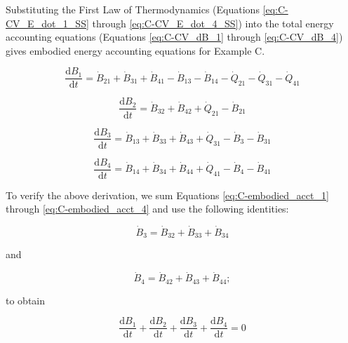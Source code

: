 \documentclass[authoryear,preprint,review,12pt]{elsarticle}
\begin{document}
Substituting the First Law of Thermodynamics (Equations \ref{eq:C-CV_E_dot_1_SS} through \ref{eq:C-CV_E_dot_4_SS}) into the total energy accounting equations (Equations \ref{eq:C-CV_dB_1} through \ref{eq:C-CV_dB_4}) gives embodied energy accounting equations for Example C.

\begin{equation} \label{eq:C-embodied_acct_1}
	\frac{\mathrm{d}B_{1}}{\mathrm{d}t} 	 = \dot{B}_{21} + \dot{B}_{31} + \dot{B}_{41} - \dot{B}_{13} - \dot{B}_{14} - \dot{Q}_{21} - \dot{Q}_{31} - \dot{Q}_{41}
\end{equation}

\begin{equation} \label{eq:C-embodied_acct_2}
	\frac{\mathrm{d}B_{2}}{\mathrm{d}t} 	 = \dot{B}_{32} + \dot{B}_{42} + \dot{Q}_{21} - \dot{B}_{21}
\end{equation}

\begin{equation} \label{eq:C-embodied_acct_3}
	\frac{\mathrm{d}B_{3}}{\mathrm{d}t} 	 = \dot{B}_{13} + \dot{B}_{33} + \dot{B}_{43} + \dot{Q}_{31} - \dot{B}_{3} - \dot{B}_{31}
\end{equation}

\begin{equation} \label{eq:C-embodied_acct_4}
	\frac{\mathrm{d}B_{4}}{\mathrm{d}t}	 = \dot{B}_{14} + \dot{B}_{34} + \dot{B}_{44} + \dot{Q}_{41} - \dot{B}_{4} - \dot{B}_{41}
\end{equation}

To verify the above derivation, we sum Equations \ref{eq:C-embodied_acct_1} through \ref{eq:C-embodied_acct_4} and use the following identities:

\begin{equation} \label{eq:C-B_sum_3_output}
	\dot{B}_3 = \dot{B}_{32} + \dot{B}_{33} + \dot{B}_{34}
\end{equation}

\noindent and

\begin{equation} \label{eq:C-B_sum_4_output}
	\dot{B}_4 = \dot{B}_{42} + \dot{B}_{43} + \dot{B}_{44};
\end{equation}

\noindent to obtain

\begin{equation} \label{eq:C-B_sums_to_zero}
	\frac{\mathrm{d}B_{1}}{\mathrm{d}t} + \frac{\mathrm{d}B_{2}}{\mathrm{d}t} + \frac{\mathrm{d}B_{3}}{\mathrm{d}t} + \frac{\mathrm{d}B_{4}}{\mathrm{d}t} = 0
\end{equation}
\end{document}
